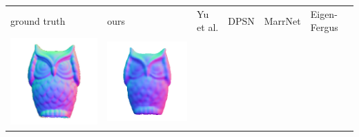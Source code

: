 \begin{center}
\begin{tabularx}{\linewidth}{@{}Y@{}Y@{}Y@{}Y@{}Y@{}Y@{}}
ground truth & ours & Yu et al. & DPSN & MarrNet & Eigen-Fergus \\
\includegraphics[width=\linewidth]{semisynthetic/20150514_15_gt.png} &
\includegraphics[width=\linewidth]{semisynthetic/20150514_15_ours_out.png} &

\end{tabularx}
\end{center}
